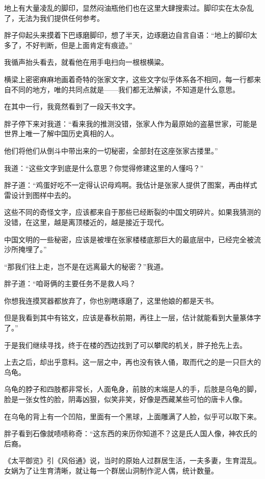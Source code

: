 地上有大量凌乱的脚印，显然闷油瓶他们也在这里大肆搜索过。脚印实在太杂乱了，无法为我们提供任何参考。

胖子仰起头来摸着下巴琢磨脚印，想了半天，边琢磨边自言自语：“地上的脚印太多了，不好判断，但是上面肯定有痕迹。”

我循声抬头看去，就看他在用手电扫向一根根横粱。

横梁上密密麻麻地画着奇特的张家文字，这些文字似乎体系各不相同，每一行都来自不同的地方，唯的共同点就是——我们都无法解读，不知道是什么意思。

在其中一行，我竟然看到了一段天书文字。

胖子停下来对我道：“看来我的推测没错，张家人作为最原始的盗墓世家，可能是世界上唯一了解中国历史真相的人。

他们将他们从倒斗中带出来的一切秘密，全部封在这座张家古搂里。”

我道：“这些文字到底是什么意思？你觉得修建这里的人懂吗？”

胖子道：“鸡蛋好吃不一定得认识母鸡啊。我估计是张家人提供了图案，再由样式雷设计到图样中去的。

这些不同的奇怪文字，应该都来自于那些已经断裂的中国文明碎片。如果我猜测的没错，在这里，越是离顶楼近的，越是接近于现代。

中国文明的一些秘密，应该是被埋在张家楼楼底那巨大的最底层中，已经完全被流沙所掩埋了。”

“那我们往上走，岂不是在远离最大的秘密？”我道。

胖子道：“咱哥俩的主要任务不是救人吗？

你想我连摸冥器都放弃了，你也别瞎琢磨了，这里他娘的都是天书。

但是我看到其中有铭文，应该是春秋前期，再往上一层，估计就能看到大量篆体字了。”

于是我们继续寻找，终于在楼的西边找到了可以攀爬的机关，胖子抢先上去。

上去之后，却出乎意料。这一层之中，再也没有铁人俑，取而代之的是一只巨大的乌龟。

乌龟的脖子和四肢都非常长，人面龟身，前肢的末端是人的手，后肢是乌龟的脚，脸是一张女性的脸，阴毒凶狠，似笑非笑，好像是西藏某些可怕的唐卡人像。

在乌龟的背上有一个凹陷，里面有一个黑球，上面雕满了人脸，似乎可以取下来。

胖子看到石像就啧啧称奇：“这东西的来历你知道不？这是氏人国人像，神农氏的后裔。

《太平御览》引《风俗通》说，当时的原始人过群居生活，一夫多妻，生育混乱。女娲为了让生育清晰，就让每一个群居山洞制作泥人偶，统计数量。

